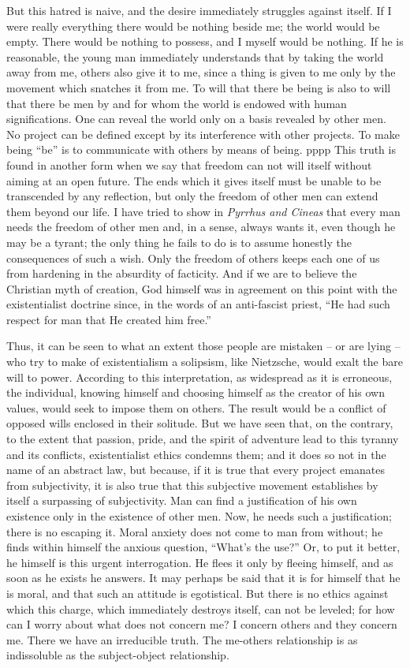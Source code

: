 \documentclass[11pt]{article}
\begin{document}
{{But this hatred is naive, and the desire immediately struggles against itself. If I were really everything there would be nothing beside me; the world would be empty. There would be nothing to possess, and I myself would be nothing. If he is reasonable, the young man immediately understands that by taking the world away from me, others also give it to me, since a thing is given to me only by the movement which snatches it from me. To will that there be being is also to will that there be men by and for whom the world is endowed with human significations. One can reveal the world only on a basis revealed by other men. No project can be defined except by its interference with other projects. To make being “be” is to communicate with others by means of being.
pppp
This truth is found in another form when we say that freedom can not will itself without aiming at an open future. The ends which it gives itself must be unable to be transcended by any reflection, but only the freedom of other men can extend them beyond our life. I have tried to show in \textit{Pyrrhus and Cineas} that every man needs the freedom of other men and, in a sense, always wants it, even though he may be a tyrant; the only thing he fails to do is to assume honestly the consequences of such a wish. Only the freedom of others keeps each one of us from hardening in the absurdity of facticity. And if we are to believe the Christian myth of creation, God himself was in agreement on this point with the existentialist doctrine since, in the words of an anti-fascist priest, “He had such respect for man that He created him free.”

Thus, it can be seen to what an extent those people are mistaken – or are lying – who try to make of existentialism a solipsism, like Nietzsche, would exalt the bare will to power. According to this interpretation, as widespread as it is erroneous, the individual, knowing himself and choosing himself as the creator of his own values, would seek to impose them on others. The result would be a conflict of opposed wills enclosed in their solitude. But we have seen that, on the contrary, to the extent that passion, pride, and the spirit of adventure lead to this tyranny and its conflicts, existentialist ethics condemns them; and it does so not in the name of an abstract law, but because, if it is true that every project emanates from subjectivity, it is also true that this subjective movement establishes by itself a surpassing of subjectivity. Man can find a justification of his own existence only in the existence of other men. Now, he needs such a justification; there is no escaping it. Moral anxiety does not come to man from without; he finds within himself the anxious question, “What’s the use?” Or, to put it better, he himself is this urgent interrogation. He flees it only by fleeing himself, and as soon as he exists he answers. It may perhaps be said that it is for himself that he is moral, and that such an attitude is egotistical. But there is no ethics against which this charge, which immediately destroys itself, can not be leveled; for how can I worry about what does not concern me? I concern others and they concern me. There we have an irreducible truth. The me-others relationship is as indissoluble as the subject-object relationship.

}}
\end{document}
